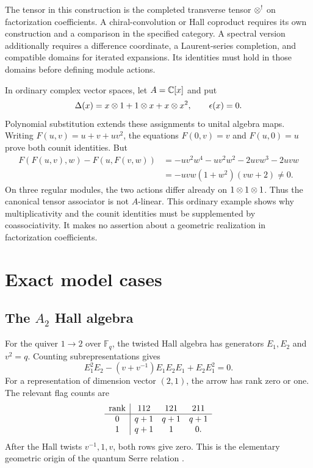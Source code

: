 The tensor in this construction is the completed transverse tensor
$\otimes^!$ on factorization coefficients.
A chiral-convolution or Hall coproduct requires its own construction
and a comparison in the specified category.
A spectral version additionally requires a difference coordinate,
a Laurent-series completion, and compatible domains for iterated expansions.
Its identities must hold in those domains before defining module actions.

\begin{example}
In ordinary complex vector spaces, let $A=\mathbb C[x]$ and put
\[
 \Delta(x)=x\otimes1+1\otimes x+x\otimes x^2,
 \qquad \epsilon(x)=0.
\]
Polynomial substitution extends these assignments to unital algebra maps.
Writing $F(u,v)=u+v+uv^2$, the equations
$F(0,v)=v$ and $F(u,0)=u$ prove both counit identities.
But
\[
\begin{split}
 F(F(u,v),w)-F(u,F(v,w))
 &=-uv^2w^4-uv^2w^2-2uvw^3-2uvw\\
 &=-uvw(1+w^2)(vw+2)\ne0.
\end{split}
\]
On three regular modules, the two actions differ already on
$1\otimes1\otimes1$.
Thus the canonical tensor associator is not $A$-linear.
This ordinary example shows why multiplicativity and the counit identities
must be supplemented by coassociativity.
It makes no assertion about a geometric realization in factorization coefficients.
\end{example}

\part{Exact model cases}

\chapter{The \texorpdfstring{$A_2$}{A2} Hall algebra}
For the quiver $1\to2$ over $\mathbb F_q$, the twisted Hall algebra has generators $E_1,E_2$ and $v^2=q$. Counting subrepresentations gives
\[
 E_1^2E_2-(v+v^{-1})E_1E_2E_1+E_2E_1^2=0.
\]
For a representation of dimension vector $(2,1)$, the arrow has rank zero or one. The relevant flag counts are
\[
\begin{array}{c|ccc}
\operatorname{rank}&112&121&211\\ \hline
0&q+1&q+1&q+1\\
1&q+1&1&0.
\end{array}
\]
After the Hall twists $v^{-1},1,v$, both rows give zero. This is the elementary geometric origin of the quantum Serre relation \cite{Ringel,Green}.

